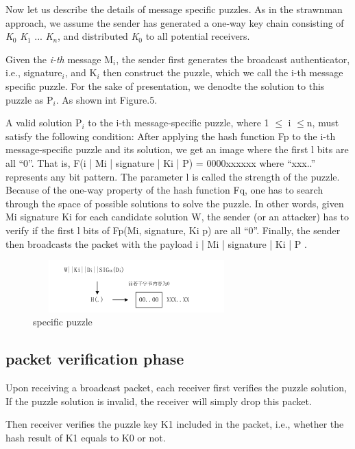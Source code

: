 \documentclass{sig-alternate-05-2015}
\begin{document}
Now let us describe the details of message specific puzzles. As in the strawnman approach, we assume the sender has generated a one-way key chain consisting of  \emph{K$_0$} \emph{K$_1$} ... \emph{K$_n$}, and distributed \emph{K$_0$} to all potential receivers. 

		Given the \emph{i-th} message M$_i$, the sender first generates the broadcast authenticator, i.e., signature$_i$, and K$_i$ then construct the puzzle, which we call the i-th message specific puzzle. For the sake of presentation, we denodte the solution to this puzzle as P$_i$. As shown int Figure.5.
		
	

A valid solution P$_i$ to the i-th message-specific puzzle, where 1 $\leq$ i $\leq$n, must satisfy the following condition:
After applying the hash function Fp to the i-th message-specific puzzle and its solution, we get an image where the first l bits are all ``0''. That is,
F(i | Mi | signature | Ki | P) = 0000xxxxxx
where ``xxx..'' represents any bit pattern. The parameter l is called the strength of the puzzle.
Because of the one-way property of the hash function Fq, one has to search through the space of possible solutions to solve the puzzle. In other words, given Mi signature Ki for each candidate solution W, the sender (or an attacker) has to verify if the first l bits of Fp(Mi, signature, Ki p) are all ``0''.
Finally, the sender then broadcasts the packet with the payload i | Mi | signature | Ki | P .
		
\begin{figure}
\centering
\includegraphics[width=8cm,height=2cm]{SpecificPuzzle.pdf}
\caption{specific puzzle}
\label{} 
\end{figure}



\subsection{packet verification phase}
Upon receiving a broadcast packet, each receiver first verifies the puzzle solution, If the puzzle solution is invalid, the receiver will simply drop this packet. 

Then receiver verifies the puzzle key K1 included in the packet, i.e., whether the hash result of K1 equals to K0 or not.
\end{document}
